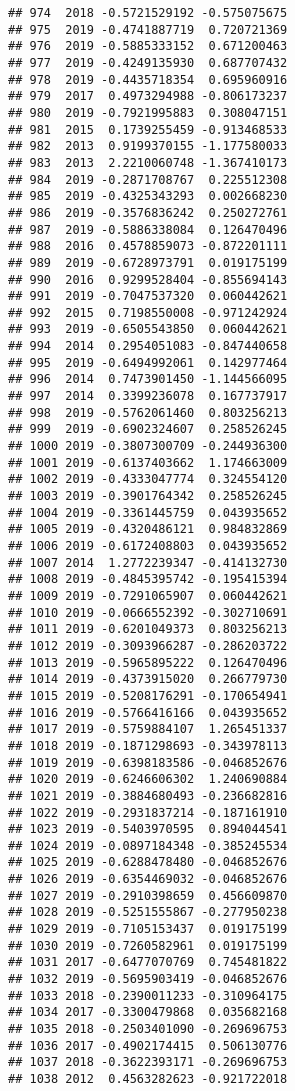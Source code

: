 \documentclass[
]{article}
\begin{document}
\begin{verbatim}
## 974  2018 -0.5721529192 -0.575075675
## 975  2019 -0.4741887719  0.720721369
## 976  2019 -0.5885333152  0.671200463
## 977  2019 -0.4249135930  0.687707432
## 978  2019 -0.4435718354  0.695960916
## 979  2017  0.4973294988 -0.806173237
## 980  2019 -0.7921995883  0.308047151
## 981  2015  0.1739255459 -0.913468533
## 982  2013  0.9199370155 -1.177580033
## 983  2013  2.2210060748 -1.367410173
## 984  2019 -0.2871708767  0.225512308
## 985  2019 -0.4325343293  0.002668230
## 986  2019 -0.3576836242  0.250272761
## 987  2019 -0.5886338084  0.126470496
## 988  2016  0.4578859073 -0.872201111
## 989  2019 -0.6728973791  0.019175199
## 990  2016  0.9299528404 -0.855694143
## 991  2019 -0.7047537320  0.060442621
## 992  2015  0.7198550008 -0.971242924
## 993  2019 -0.6505543850  0.060442621
## 994  2014  0.2954051083 -0.847440658
## 995  2019 -0.6494992061  0.142977464
## 996  2014  0.7473901450 -1.144566095
## 997  2014  0.3399236078  0.167737917
## 998  2019 -0.5762061460  0.803256213
## 999  2019 -0.6902324607  0.258526245
## 1000 2019 -0.3807300709 -0.244936300
## 1001 2019 -0.6137403662  1.174663009
## 1002 2019 -0.4333047774  0.324554120
## 1003 2019 -0.3901764342  0.258526245
## 1004 2019 -0.3361445759  0.043935652
## 1005 2019 -0.4320486121  0.984832869
## 1006 2019 -0.6172408803  0.043935652
## 1007 2014  1.2772239347 -0.414132730
## 1008 2019 -0.4845395742 -0.195415394
## 1009 2019 -0.7291065907  0.060442621
## 1010 2019 -0.0666552392 -0.302710691
## 1011 2019 -0.6201049373  0.803256213
## 1012 2019 -0.3093966287 -0.286203722
## 1013 2019 -0.5965895222  0.126470496
## 1014 2019 -0.4373915020  0.266779730
## 1015 2019 -0.5208176291 -0.170654941
## 1016 2019 -0.5766416166  0.043935652
## 1017 2019 -0.5759884107  1.265451337
## 1018 2019 -0.1871298693 -0.343978113
## 1019 2019 -0.6398183586 -0.046852676
## 1020 2019 -0.6246606302  1.240690884
## 1021 2019 -0.3884680493 -0.236682816
## 1022 2019 -0.2931837214 -0.187161910
## 1023 2019 -0.5403970595  0.894044541
## 1024 2019 -0.0897184348 -0.385245534
## 1025 2019 -0.6288478480 -0.046852676
## 1026 2019 -0.6354469032 -0.046852676
## 1027 2019 -0.2910398659  0.456609870
## 1028 2019 -0.5251555867 -0.277950238
## 1029 2019 -0.7105153437  0.019175199
## 1030 2019 -0.7260582961  0.019175199
## 1031 2017 -0.6477070769  0.745481822
## 1032 2019 -0.5695903419 -0.046852676
## 1033 2018 -0.2390011233 -0.310964175
## 1034 2017 -0.3300479868  0.035682168
## 1035 2018 -0.2503401090 -0.269696753
## 1036 2017 -0.4902174415  0.506130776
## 1037 2018 -0.3622393171 -0.269696753
## 1038 2012  0.4563282623 -0.921722018

\end{verbatim}
\end{document}
